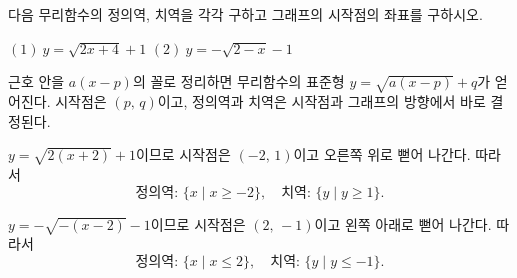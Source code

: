 \documentclass[10pt]{article}
\begin{document}
\newpage


\begin{dmproblem}
다음 무리함수의 정의역, 치역을 각각 구하고 그래프의 시작점의 좌표를 구하시오.

\smallskip

$(1)\ y = \sqrt{2x + 4} + 1$
\qquad
$(2)\ y = -\sqrt{2 - x} - 1$
\end{dmproblem}

\begin{dmapproach}
근호 안을 $a(x - p)$의 꼴로 정리하면 무리함수의 표준형 $y = \sqrt{a(x - p)} + q$가 얻어진다. 시작점은 $(p,\, q)$이고, 정의역과 치역은 시작점과 그래프의 방향에서 바로 결정된다.
\end{dmapproach}

\begin{dmsolution}
 $y = \sqrt{2(x + 2)} + 1$이므로 시작점은 $(-2,\, 1)$이고 오른쪽 위로 뻗어 나간다. 따라서
\[ \text{정의역: } \{x \mid x \ge -2\}, \quad \text{치역: } \{y \mid y \ge 1\}. \]

 $y = -\sqrt{-(x - 2)} - 1$이므로 시작점은 $(2,\, -1)$이고 왼쪽 아래로 뻗어 나간다. 따라서
\[ \text{정의역: } \{x \mid x \le 2\}, \quad \text{치역: } \{y \mid y \le -1\}. \]
\end{dmsolution}

\dmchecktitle


\end{document}
